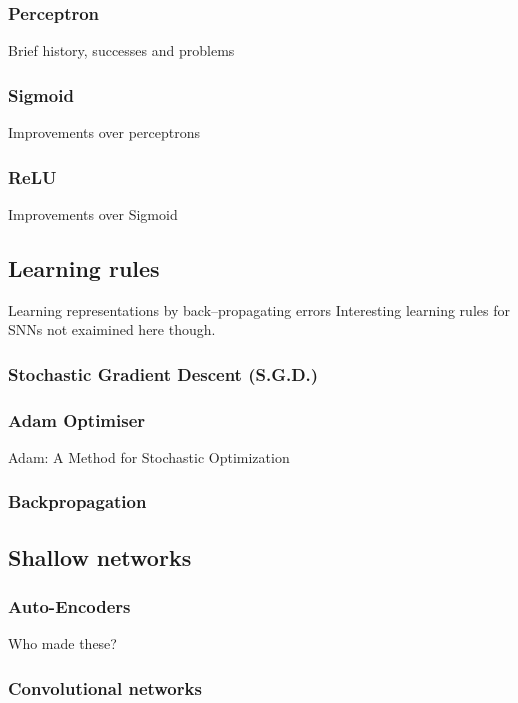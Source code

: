 \subsubsection{Perceptron}
Brief history, successes and problems

\subsubsection{Sigmoid}
Improvements over perceptrons

\subsubsection{ReLU}
Improvements over Sigmoid

\subsection{Learning rules}
Learning representations by back--propagating errors\cite{Rumelhart1986}
Interesting learning rules for SNNs \cite{Bichler} not exaimined here though.

\subsubsection{Stochastic Gradient Descent (S.G.D.)}

\subsubsection{Adam Optimiser}
Adam: A Method for Stochastic Optimization \cite{kingma2014adam}

\subsubsection{Backpropagation}


\subsection{Shallow networks}  

\subsubsection{Auto-Encoders}  %
Who made these?

\subsubsection{Convolutional networks}

